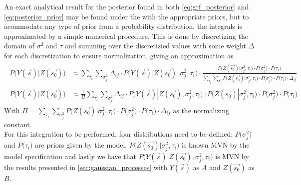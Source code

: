 \documentclass{report}
\begin{document}
An exact analytical result for the posterior found in both \ref{eq:grf_posterior} and \ref{eq:posterior_prior} may be found under the with the appropriate priors, but to acommodate any type of prior from a probability distribution, the integrals is approximated by a simple numerical procedure. This is done by discretizing the domain of $\sigma^2$ and $\tau$ and summing over the discretizied values with some weight $\Delta$ for each discretization to ensure normalization, giving an approximation as
\begin{align*}
\begin{split}
P \big( Y(\vec{s}) | Z(\vec{s_0}) \big) &\approx \sum_{\tau_i} \sum_{\sigma^2_j} \Delta_{ij} \cdot P \big( Y(\vec{s}) | Z(\vec{s_0}), \sigma^2_j, \tau_i \big) \cdot \frac{P\big( Z(\vec{s_0}) | \sigma^2_j, \tau_i \big) \cdot P\big( \sigma^2_j \big) \cdot P\big( \tau_i \big)}{\sum_{\tau_i} \sum_{\sigma^2_j} P\big( Z(\vec{s_0}) | \sigma^2_j, \tau_i \big) \cdot P\big( \sigma^2_j \big) \cdot P\big( \tau_i \big) \cdot \Delta_{ij} } \ \\
P \big( Y(\vec{s}) | Z(\vec{s_0}) \big) &\approx \frac{1}{\Pi}\sum_{\tau_i} \sum_{\sigma^2_j} \Delta_{ij} \cdot P \big( Y(\vec{s}) | Z(\vec{s_0}), \sigma^2_j, \tau_i \big) \cdot P\big( Z(\vec{s_0}) | \sigma^2_j, \tau_i \big) \cdot P\big( \sigma^2_j \big) \cdot P\big( \tau_i \big)  
\end{split}
\end{align*}
With $\Pi = \sum_{\tau_i} \sum_{\sigma^2_j} P\big( Z(\vec{s_0}) | \sigma^2_j, \tau_i \big) \cdot P\big( \sigma^2_j \big) \cdot P\big( \tau_i \big) \cdot \Delta_{ij}$ as the normalizing constant. \\

For this integration to be performed, four distributions need to be defined: $P\big( \sigma^2_j \big)$ and $P\big( \tau_i \big)$ are priors given by the model, $P\big( Z(\vec{s_0}) | \sigma^2_j, \tau_i \big)$ is known MVN by the model specification and lastly we have that $P \big( Y(\vec{s}) | Z(\vec{s_0}), \sigma^2_j, \tau_i \big)$ is MVN by the results presented in \ref{sec:gaussian_processes} with $Y(\vec{s})$ as $A$ and $Z(\vec{s_0})$ as $B$. \\
\end{document}
